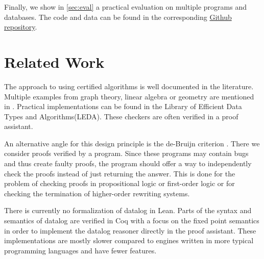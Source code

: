 Finally, we show in \cref{sec:eval} a practical evaluation on multiple programs and databases. The code and data can be found in the corresponding \href{https://github.com/knowsys/CertifyingDatalog/tree/diplomarbeit}{Github repository}.

\section{Related Work}

The approach to using certified algorithms is well documented in the literature. Multiple examples from graph theory, linear algebra or geometry are mentioned in \cite{CertAlg}. Practical implementations can be found in the Library of Efficient Data Types and Algorithms(LEDA)\cite{Leda}. These checkers are often verified in a proof assistant\cite{CertCheckerWorkflow}.

An alternative angle for this design principle is the de-Bruijn criterion \cite{deBruijnCriterion}. There we consider proofs verified by a program. Since these programs may contain bugs and thus create faulty proofs, the program should offer a way to independently check the proofs instead of just returning the answer. This is done for the problem of checking proofs in propositional logic\cite{deBruijnPropProof} or first-order logic\cite{deBruijnFOProof} or for checking the termination of higher-order rewriting systems\cite{deBruijnRewriting}.

There is currently no formalization of datalog in Lean. Parts of the syntax and semantics of datalog are verified in Coq\cite{datalogCoq} with a focus on the fixed point semantics in order to implement the datalog reasoner directly in the proof assistant\cite{datalogCoq, regularDatalogCoq}. These implementations are mostly slower compared to engines written in more typical programming languages and have fewer features.